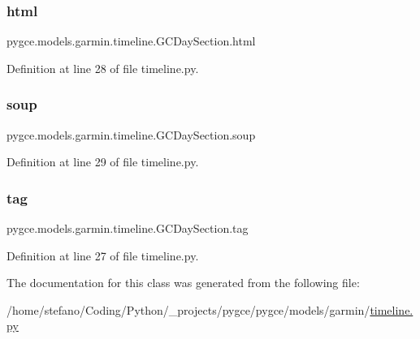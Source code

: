 \subsubsection{\texorpdfstring{html}{html}}
{\footnotesize\ttfamily pygce.\+models.\+garmin.\+timeline.\+G\+C\+Day\+Section.\+html}



Definition at line 28 of file timeline.\+py.

\mbox{\label{classpygce_1_1models_1_1garmin_1_1timeline_1_1_g_c_day_section_ae04dcff466d78ae686dce462057260a9}} 
\subsubsection{\texorpdfstring{soup}{soup}}
{\footnotesize\ttfamily pygce.\+models.\+garmin.\+timeline.\+G\+C\+Day\+Section.\+soup}



Definition at line 29 of file timeline.\+py.

\mbox{\label{classpygce_1_1models_1_1garmin_1_1timeline_1_1_g_c_day_section_a3dacbeacfedec2f69dcbb9fe6870f8a3}} 
\subsubsection{\texorpdfstring{tag}{tag}}
{\footnotesize\ttfamily pygce.\+models.\+garmin.\+timeline.\+G\+C\+Day\+Section.\+tag}



Definition at line 27 of file timeline.\+py.



The documentation for this class was generated from the following file\+:\begin{DoxyCompactItemize}
\item 
/home/stefano/\+Coding/\+Python/\+\_\+projects/pygce/pygce/models/garmin/\hyperlink{timeline_8py}{timeline.\+py}\end{DoxyCompactItemize}

